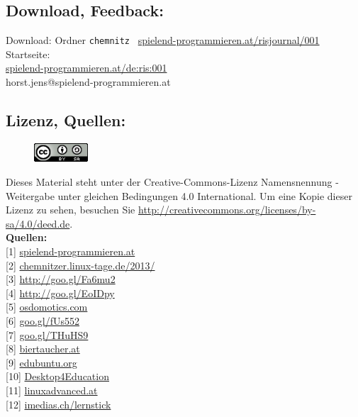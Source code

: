 \subsection*{Download, Feedback:}
\footnotesize{
Download: Ordner \texttt{chemnitz} \Mundus\ \href{http://spielend-programmieren.at/risjournal/001}{spielend-programmieren.at/risjournal/001}\\
Startseite:\\
\href{http://spielend-programmieren.at/de:ris:001}{spielend-programmieren.at/de:ris:001}\\ 
\Letter\: horst.jens@spielend-programmieren.at}
\normalsize

\subsection*{Lizenz, Quellen:}
\begin{figure}
\includegraphics[width=2cm]{chemnitz/ccbysa88x31.png}
\end{figure}
Dieses Material steht unter der Creative-Commons-Lizenz Namensnennung - Weitergabe unter gleichen Bedingungen 4.0 International. Um eine Kopie dieser Lizenz zu sehen, besuchen Sie \url{http://creativecommons.org/licenses/by-sa/4.0/deed.de}. \\

\textbf{Quellen:} \\
{[}1{]} \href{http://spielend-programmieren.at}{spielend-programmieren.at} \\
{[}2{]} \href{http://chemnitzer.linux-tage.de/2013/}{chemnitzer.linux-tage.de/2013/} \\
{[}3{]} \href{http://wiki.skolelinux.de/KurtGramlich/Biografie}{http://goo.gl/Fa6mu2} \\
{[}4{]} \href{http://datenkanal.org/archives/14-Interview-mit-Kurt-Gramlich-zu-Skolelinux.html}{http://goo.gl/EoIDpy} \\
{[}5{]} \href{http://osdomotics.com}{osdomotics.com} \\
{[}6{]} \href{http://spielend-programmieren.at/de:sonstiges:alter_blog:2009:0318_chemnitzer_linux-tage_2009}{goo.gl/fUs552} \\
{[}7{]} \href{https://plus.google.com/u/0/112888349007751740309/about}{goo.gl/THuHS9} \\
{[}8{]} \href{http://biertaucher.at}{biertaucher.at} \\
{[}9{]} \href{http://www.edubuntu.org/}{edubuntu.org} \\
{[}10{]} \href{http://d4e.at/}{Desktop4Education} \\
{[}11{]} \href{http://www.linuxadvanced.at/}{linuxadvanced.at} \\
{[}12{]} \href{http://www.imedias.ch/lernstick}{imedias.ch/lernstick} 


